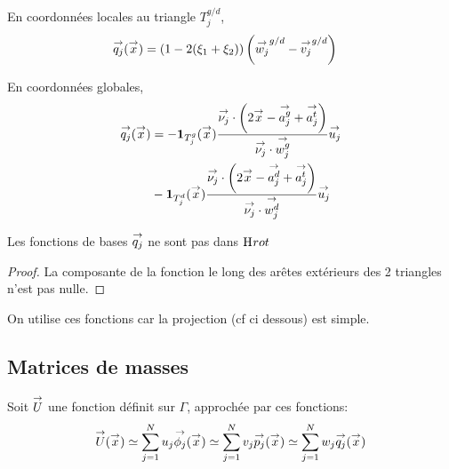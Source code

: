       \begin{minipage}{0.45\textwidth}
        \begin{center}
          \begin{tikzpicture}[scale=1]
            
          \end{tikzpicture}
        \end{center}
          \label{fig:form_int:fon_base:q}
      \end{minipage}
      \begin{minipage}{0.54\textwidth}
        En coordonnées locales au triangle \(T_j^{g/d}\),
        \begin{align*}
          \qj(\vx) &= \left(1-2(\xi_1+\xi_2)\right)\left(\vect{w_j}^{g/d} - \vect{v_j}^{g/d} \right)
        \end{align*}

        En coordonnées globales,
        \begin{align*}
          \qj(\vx)
          &= - \mathbf{1}_{T_j^g}(\vx) \frac{\nuj\cdot\left(2\vx - {\vect{a_j^g} + \vect{a_j^t}}\right)}{\nuj\cdot \vect{w_j^g}} \uj \\
          &- \mathbf{1}_{T_j^d}(\vx) \frac{\nuj\cdot\left(2\vx - {\vect{a_j^d} + \vect{a_j^t}}\right)}{\nuj\cdot\vect{w_j^d}}\uj
        \end{align*}
      \end{minipage}

      \begin{prop}
        Les fonctions de bases \(\qj\) ne sont pas dans \(\Hrot\)
      \end{prop}
      \begin{proof}
        La composante de la fonction le long des arêtes extérieurs des 2 triangles n'est pas nulle.
      \end{proof}

      \begin{TODO}
        On utilise ces fonctions car la projection (cf ci dessous) est simple.
      \end{TODO}


  \subsection{Matrices de masses}
    Soit \(\vect{U}\) une fonction définit sur \(\Gamma\), approchée par ces fonctions:
    \begin{equation}
    \vect{U}(\vx) \simeq \sum\limits_{j=1}^N u_j \phij(\vx) \simeq \sum\limits_{j=1}^N v_j \pj(\vx) \simeq \sum\limits_{j=1}^N w_j \qj(\vx)
    \end{equation}

